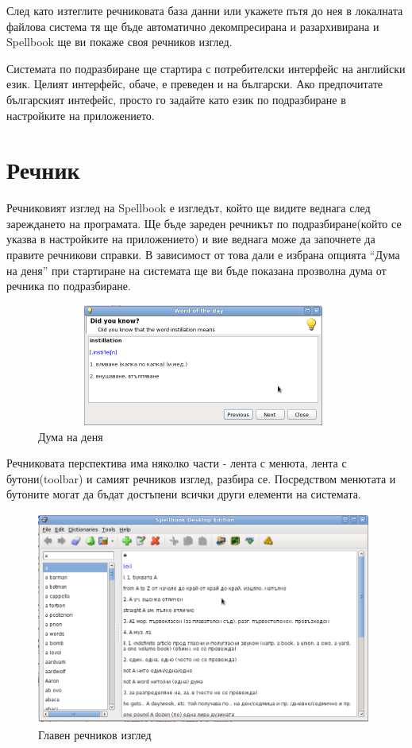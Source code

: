 След като изтеглите речниковата база данни или укажете пътя до нея в
локалната файлова система тя ще бъде автоматично декомпресирана и
разархивирана и Spellbook ще ви покаже своя речников изглед.

Системата по подразбиране ще стартира с потребителски интерфейс на
английски език. Целият интерфейс, обаче, е преведен и на
български. Ако предпочитате българският интефейс, просто го задайте
като език по подразбиране в настройките на приложението.
\section{Речник}
Речниковият изглед на Spellbook е изгледът, който ще видите веднага
след зареждането на програмата. Ще бъде зареден речникът по
подразбиране(който се указва в настройките на приложението) и вие
веднага може да започнете да правите речникови справки. В зависимост
от това дали е избрана опцията "`Дума на деня"' при стартиране на
системата ще ви бъде показана прозволна дума от речника по подразбиране.
\begin{figure}[htbp]
  \caption{Дума на деня}
  \centering
  \includegraphics[width=110mm, height=40mm]{images/word_of_the_day.png}
\end{figure}

Речниковата перспектива има няколко части - лента с менюта, лента с
бутони(toolbar) и самият речников изглед, разбира се. Посредством
менютата и бутоните могат да бъдат достъпени всички други елементи на системата.
\begin{figure}[htbp]
  \caption{Главен речников изглед}
  \centering
  \includegraphics[width=110mm, height=70mm]{images/dictionary_view.png}
\end{figure}

